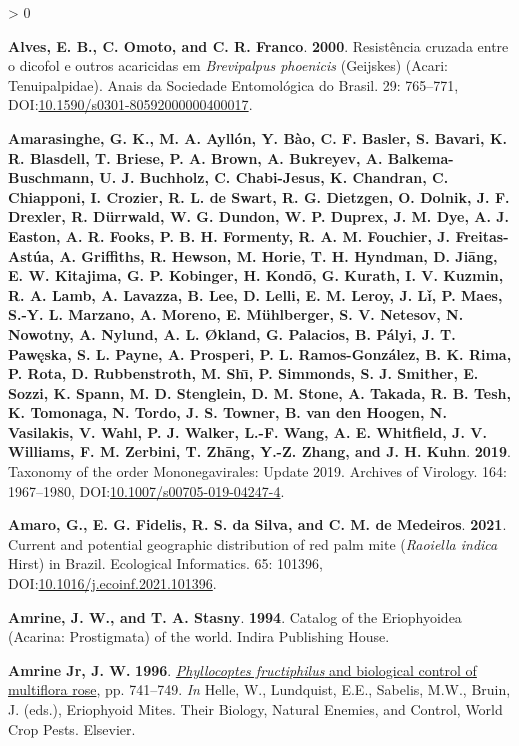 \documentclass{ufdissertation}[overrideChapters] %
\newlength{\cslhangindent}
\newenvironment{CSLReferences}[2] %
 {%
  \setlength{\parindent}{0pt}
  \ifodd #1 \everypar{\setlength{\hangindent}{\cslhangindent}}\ignorespaces\fi
  \ifnum #2 > 0
  \setlength{\parskip}{#2\baselineskip}
  \fi
 }%
 {}
\begin{document}
{\begin{CSLReferences}{1}{1}
\leavevmode{}%
\textbf{Alves, E. B., C. Omoto, and C. R. Franco}. \textbf{2000}. Resist{ê}ncia cruzada entre o dicofol e outros acaricidas em {\emph{Brevipalpus phoenicis}} ({Geijskes}) ({Acari}: {Tenuipalpidae}). Anais da Sociedade Entomol{ó}gica do Brasil. 29: 765--771, DOI:\href{https://doi.org/10.1590/s0301-80592000000400017}{10.1590/s0301-80592000000400017}.

\leavevmode{}%
\textbf{Amarasinghe, G. K., M. A. Ayllón, Y. Bào, C. F. Basler, S. Bavari, K. R. Blasdell, T. Briese, P. A. Brown, A. Bukreyev, A. Balkema-Buschmann, U. J. Buchholz, C. Chabi-Jesus, K. Chandran, C. Chiapponi, I. Crozier, R. L. de Swart, R. G. Dietzgen, O. Dolnik, J. F. Drexler, R. Dürrwald, W. G. Dundon, W. P. Duprex, J. M. Dye, A. J. Easton, A. R. Fooks, P. B. H. Formenty, R. A. M. Fouchier, J. Freitas-Astúa, A. Griffiths, R. Hewson, M. Horie, T. H. Hyndman, D. Jiāng, E. W. Kitajima, G. P. Kobinger, H. Kondō, G. Kurath, I. V. Kuzmin, R. A. Lamb, A. Lavazza, B. Lee, D. Lelli, E. M. Leroy, J. Lǐ, P. Maes, S.-Y. L. Marzano, A. Moreno, E. Mühlberger, S. V. Netesov, N. Nowotny, A. Nylund, A. L. Økland, G. Palacios, B. Pályi, J. T. Pawęska, S. L. Payne, A. Prosperi, P. L. Ramos-González, B. K. Rima, P. Rota, D. Rubbenstroth, M. Shı̄, P. Simmonds, S. J. Smither, E. Sozzi, K. Spann, M. D. Stenglein, D. M. Stone, A. Takada, R. B. Tesh, K. Tomonaga, N. Tordo, J. S. Towner, B. van den Hoogen, N. Vasilakis, V. Wahl, P. J. Walker, L.-F. Wang, A. E. Whitfield, J. V. Williams, F. M. Zerbini, T. Zhāng, Y.-Z. Zhang, and J. H. Kuhn}. \textbf{2019}. Taxonomy of the order {Mononegavirales}: Update 2019. Archives of Virology. 164: 1967--1980, DOI:\href{https://doi.org/10.1007/s00705-019-04247-4}{10.1007/s00705-019-04247-4}.

\leavevmode{}%
\textbf{Amaro, G., E. G. Fidelis, R. S. da Silva, and C. M. de Medeiros}. \textbf{2021}. Current and potential geographic distribution of red palm mite ({\emph{Raoiella indica}} {Hirst}) in {Brazil}. Ecological Informatics. 65: 101396, DOI:\href{https://doi.org/10.1016/j.ecoinf.2021.101396}{10.1016/j.ecoinf.2021.101396}.

\leavevmode{}%
\textbf{Amrine, J. W., and T. A. Stasny}. \textbf{1994}. Catalog of the {Eriophyoidea} ({Acarina}: {Prostigmata}) of the world. Indira Publishing House.

\leavevmode{}%
\textbf{Amrine Jr, J. W.} \textbf{1996}. \href{https://doi.org/10.1016/s1572-4379(96)80050-9}{{\emph{Phyllocoptes fructiphilus}} and biological control of multiflora rose}, pp. 741--749. \emph{In} Helle, W., Lundquist, E.E., Sabelis, M.W., Bruin, J. (eds.), Eriophyoid Mites. Their Biology, Natural Enemies, and Control, World Crop Pests. Elsevier.


\end{CSLReferences}}
\end{document}
